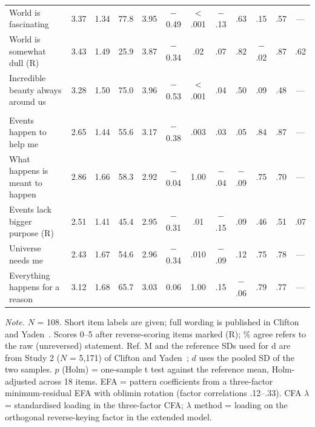 \documentclass[journal,a4paper]{IEEEtran}
\begin{document}
\begin{table}[!htbp]
\begin{tabular}{>{\raggedright\arraybackslash}p{5.0cm}ccccccccccc}
\hspace{0.8em}World is fascinating & 3.37 & 1.34 & 77.8 & 3.95 & $-$0.49 & < .001 & $-$.13 & .63 & .15 & .57 & — \\
\hspace{0.8em}World is somewhat dull (R) & 3.43 & 1.49 & 25.9 & 3.87 & $-$0.34 & .02 & .07 & .82 & $-$.02 & .87 & .62 \\
\hspace{0.8em}Incredible beauty always around us & 3.28 & 1.50 & 75.0 & 3.96 & $-$0.53 & < .001 & .04 & .50 & .09 & .48 & — \\
\multicolumn{12}{l}{\emph{Alive}} \\
\hspace{0.8em}Events happen to help me & 2.65 & 1.44 & 55.6 & 3.17 & $-$0.38 & .003 & .03 & .05 & .84 & .87 & — \\
\hspace{0.8em}What happens is meant to happen & 2.86 & 1.66 & 58.3 & 2.92 & $-$0.04 & 1.00 & $-$.04 & $-$.09 & .75 & .70 & — \\
\hspace{0.8em}Events lack bigger purpose (R) & 2.51 & 1.41 & 45.4 & 2.95 & $-$0.31 & .01 & $-$.15 & .09 & .46 & .51 & .07 \\
\hspace{0.8em}Universe needs me & 2.43 & 1.67 & 54.6 & 2.96 & $-$0.34 & .010 & $-$.09 & .12 & .75 & .78 & — \\
\hspace{0.8em}Everything happens for a reason & 3.12 & 1.68 & 65.7 & 3.03 & 0.06 & 1.00 & .15 & $-$.06 & .79 & .77 & — \\
\bottomrule
\end{tabular}

\vspace{3pt}\parbox{\textwidth}{\scriptsize \emph{Note.} $N$ = 108. Short item labels are given; full wording is published in Clifton and Yaden~\cite{cliftonyaden2021}. Scores 0–5 after reverse-scoring items marked (R); \% agree refers to the raw (unreversed) statement. Ref. M and the reference SDs used for d are from Study 2 ($N$ = 5,171) of Clifton and Yaden~\cite[online suppl., Table S2]{cliftonyaden2021}; $d$ uses the pooled SD of the two samples. $p$ (Holm) = one-sample t test against the reference mean, Holm-adjusted across 18 items. EFA = pattern coefficients from a three-factor minimum-residual EFA with oblimin rotation (factor correlations .12–.33). CFA $\lambda$ = standardised loading in the three-factor CFA; $\lambda$ method = loading on the orthogonal reverse-keying factor in the extended model.}
\end{table}
\end{document}

